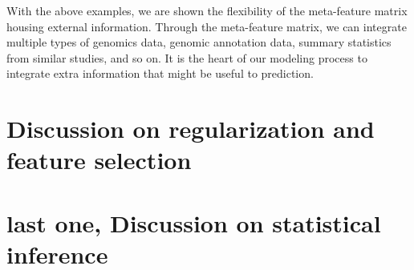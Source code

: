 With the above examples, we are shown the flexibility of the meta-feature matrix housing external information. Through the meta-feature matrix, we can integrate multiple types of genomics data, genomic annotation data, summary statistics from similar studies, and so on. It is the heart of our modeling process to integrate extra information that might be useful to prediction.

\section{Discussion on regularization and feature selection}



\section{last one, Discussion on statistical inference}